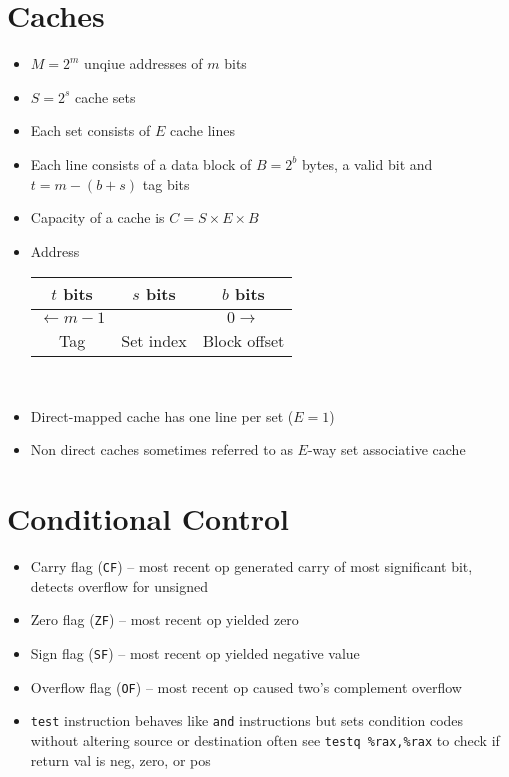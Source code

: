 \documentclass[twocolumn]{article}
\renewcommand{\tt}[1]{\texttt{#1}}
\begin{document}
\section{Caches}
\begin{itemize}[noitemsep]
    \item $M = 2^m$ unqiue addresses of $m$ bits
    \item $S = 2^s$ cache sets
    \item Each set consists of $E$ cache lines
    \item Each line consists of a data block of $B = 2^b$ bytes, a valid bit and $t = m - (b + s)$ tag bits 
    \item Capacity of a cache is $C = S \times E \times B$
    \item Address \\
    
    \begin{tabular}{| c | c | c |}
        $t$ bits & $s$ bits & $b$ bits \\ \hline
        $\leftarrow m - 1$ && $0 \rightarrow$ \\ \hline
        Tag & Set index & Block offset
    \end{tabular} \\
    \item Direct-mapped cache has one line per set ($E = 1$)
    \item Non direct caches sometimes referred to as $E$-way set associative cache
\end{itemize}

\section{Conditional Control}
\begin{itemize}[noitemsep]
    \item Carry flag (\tt{CF}) -- most recent op generated carry of most significant bit, detects overflow for unsigned
    \item Zero flag (\tt{ZF}) -- most recent op yielded zero
    \item Sign flag (\tt{SF}) -- most recent op yielded negative value
    \item Overflow flag (\tt{OF}) -- most recent op caused two's complement overflow
    \item \tt{test} instruction behaves like \tt{and} instructions but sets condition codes without altering source or destination often see \tt{testq \%rax,\%rax} to check if return val is neg, zero, or pos
\end{itemize}
\end{document}

